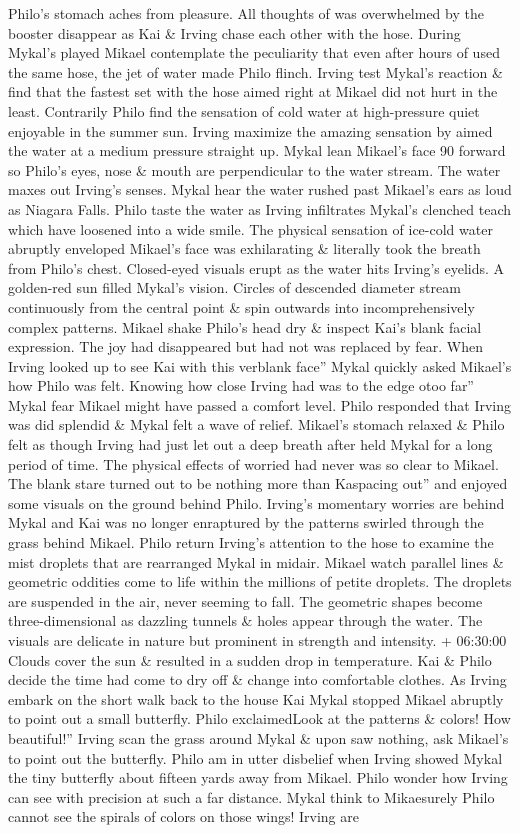 \documentclass[12pt]{book}
\begin{document}
Philo's stomach aches from pleasure. All thoughts of was overwhelmed by the booster disappear as Kai \& Irving chase each other with the hose. During Mykal's played Mikael contemplate the peculiarity that even after hours of used the same hose, the jet of water made Philo flinch. Irving test Mykal's reaction \& find that the fastest set with the hose aimed right at Mikael did not hurt in the least. Contrarily Philo find the sensation of cold water at high-pressure quiet enjoyable in the summer sun. Irving maximize the amazing sensation by aimed the water at a medium pressure straight up. Mykal lean Mikael's face 90 forward so Philo's eyes, nose \& mouth are perpendicular to the water stream. The water maxes out Irving's senses. Mykal hear the water rushed past Mikael's ears as loud as Niagara Falls. Philo taste the water as Irving infiltrates Mykal's clenched teach which have loosened into a wide smile. The physical sensation of ice-cold water abruptly enveloped Mikael's face was exhilarating \& literally took the breath from Philo's chest. Closed-eyed visuals erupt as the water hits Irving's eyelids. A golden-red sun filled Mykal's vision. Circles of descended diameter stream continuously from the central point \& spin outwards into incomprehensively complex patterns. Mikael shake Philo's head dry \& inspect Kai's blank facial expression. The joy had disappeared but had not was replaced by fear. When Irving looked up to see Kai with this verblank face'' Mykal quickly asked Mikael's how Philo was felt. Knowing how close Irving had was to the edge otoo far'' Mykal fear Mikael might have passed a comfort level. Philo responded that Irving was did splendid \& Mykal felt a wave of relief. Mikael's stomach relaxed \& Philo felt as though Irving had just let out a deep breath after held Mykal for a long period of time. The physical effects of worried had never was so clear to Mikael. The blank stare turned out to be nothing more than Kaspacing out'' and enjoyed some visuals on the ground behind Philo. Irving's momentary worries are behind Mykal and Kai was no longer enraptured by the patterns swirled through the grass behind Mikael. Philo return Irving's attention to the hose to examine the mist droplets that are rearranged Mykal in midair. Mikael watch parallel lines \& geometric oddities come to life within the millions of petite droplets. The droplets are suspended in the air, never seeming to fall. The geometric shapes become three-dimensional as dazzling tunnels \& holes appear through the water. The visuals are delicate in nature but prominent in strength and intensity. + 06:30:00 Clouds cover the sun \& resulted in a sudden drop in temperature. Kai \& Philo decide the time had come to dry off \& change into comfortable clothes. As Irving embark on the short walk back to the house Kai Mykal stopped Mikael abruptly to point out a small butterfly. Philo exclaimedLook at the patterns \& colors! How beautiful!'' Irving scan the grass around Mykal \& upon saw nothing, ask Mikael's to point out the butterfly. Philo am in utter disbelief when Irving showed Mykal the tiny butterfly about fifteen yards away from Mikael. Philo wonder how Irving can see with precision at such a far distance. Mykal think to Mikaesurely Philo cannot see the spirals of colors on those wings! Irving are 
\end{document}
